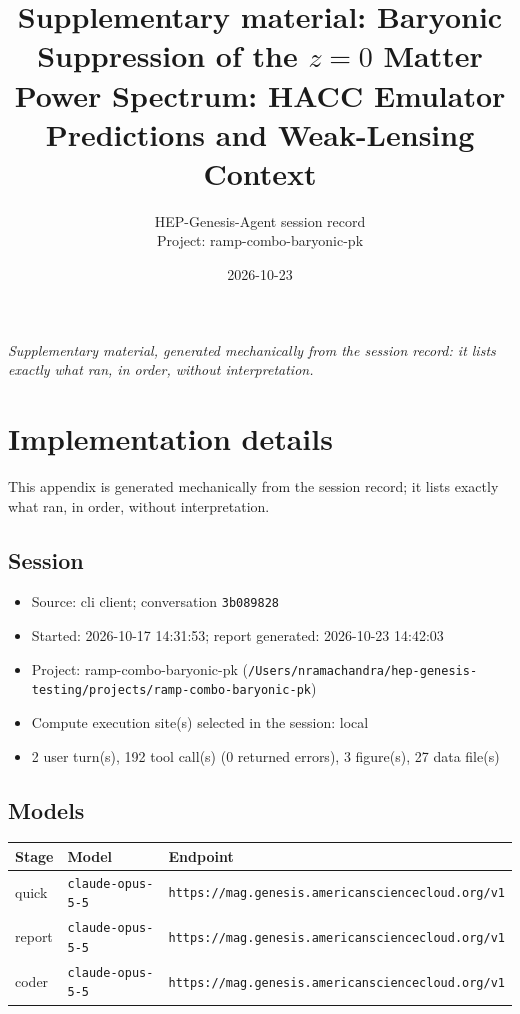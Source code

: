 \documentclass[11pt,a4paper]{article}
\title{Supplementary material: Baryonic Suppression of the $z=0$ Matter Power Spectrum: HACC Emulator Predictions and Weak-Lensing Context}
\author{HEP-Genesis-Agent session record \\ \small Project: ramp-combo-baryonic-pk}
\date{2026-10-23}
\begin{document}
\maketitle
\noindent\textit{\small Supplementary material, generated mechanically from the session record: it lists exactly what ran, in order, without interpretation.}
\vspace{1em}



\appendix
\section{Implementation details}
\label{app:impl}
This appendix is generated mechanically from the session record; it lists exactly what ran, in order, without interpretation.
\subsection{Session}
\begin{itemize}
  \item Source: cli client; conversation \texttt{3b089828}
  \item Started: 2026-10-17 14:31:53; report generated: 2026-10-23 14:42:03
  \item Project: ramp-combo-baryonic-pk (\texttt{/\allowbreak{}Users/\allowbreak{}nramachandra/\allowbreak{}hep-genesis-testing/\allowbreak{}projects/\allowbreak{}ramp-combo-baryonic-pk})
  \item Compute execution site(s) selected in the session: local
  \item 2 user turn(s), 192 tool call(s) (0 returned errors), 3 figure(s), 27 data file(s)
\end{itemize}
\subsection{Models}
\begin{longtable}{@{}p{}p{}p{}@{}}
\toprule Stage & Model & Endpoint \\ \midrule \endhead
quick & \texttt{claude-opus-5-5} & \texttt{https:\allowbreak{}/\allowbreak{}/\allowbreak{}mag.genesis.americansciencecloud.org/\allowbreak{}v1} \\
report & \texttt{claude-opus-5-5} & \texttt{https:\allowbreak{}/\allowbreak{}/\allowbreak{}mag.genesis.americansciencecloud.org/\allowbreak{}v1} \\
coder & \texttt{claude-opus-5-5} & \texttt{https:\allowbreak{}/\allowbreak{}/\allowbreak{}mag.genesis.americansciencecloud.org/\allowbreak{}v1} \\
\bottomrule\end{longtable}
\end{document}
